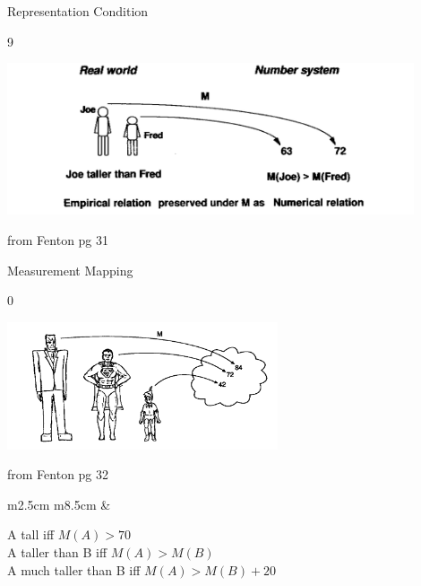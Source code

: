 \documentclass{beamer}
\begin{document}
\begin{frame}{\centerline{Representation Condition}}
9

\begin{center}
\includegraphics[width=120mm]{A2022.IDSEPC.SperimentazioneDeduzione/img-img10.png}
\newline
\end{center}

\begin{small}
\begin{center}
from Fenton pg 31
\end{center}
\end{small}

\end{frame}

\begin{frame}{\centerline{Measurement Mapping}}
0

\begin{center}
\includegraphics[width=80mm]{A2022.IDSEPC.SperimentazioneDeduzione/img-img11.png}
\begin{small}
from Fenton pg 32
\end{small}
\end{center}
\begin{table}[H]
\begin{tabulary}{\textwidth}{m{2.5cm} m{8.5cm}}
&\begin{tcolorbox}
A tall iff \(M(A) > 70\)\\
A taller than B iff \(M(A) > M(B)\)\\
A much taller than B iff \(M(A) > M(B) + 20\)
\end{tcolorbox}
\end{tabulary}
\end{table}

\end{frame}
\end{document}
